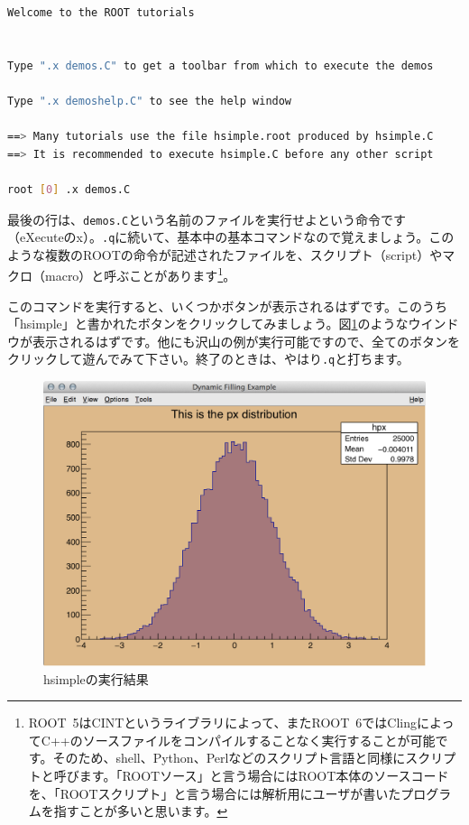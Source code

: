{\begin{lstlisting}[language=bash]
Welcome to the ROOT tutorials


Type ".x demos.C" to get a toolbar from which to execute the demos

Type ".x demoshelp.C" to see the help window

==> Many tutorials use the file hsimple.root produced by hsimple.C
==> It is recommended to execute hsimple.C before any other script

root [0] .x demos.C
\end{lstlisting}
最後の行は、\texttt{demos.C}という名前のファイルを実行せよという命令です（eXecuteのx）。\texttt{.q}に続いて、基本中の基本コマンドなので覚えましょう。このような複数のROOTの命令が記述されたファイルを、スクリプト（script）やマクロ（macro）と呼ぶことがあります\footnote{ROOT~5はCINTというライブラリによって、またROOT~6ではClingによってC++のソースファイルをコンパイルすることなく実行することが可能です。そのため、shell、Python、Perlなどのスクリプト言語と同様にスクリプトと呼びます。「ROOTソース」と言う場合にはROOT本体のソースコードを、「ROOTスクリプト」と言う場合には解析用にユーザが書いたプログラムを指すことが多いと思います。}。

このコマンドを実行すると、いくつかボタンが表示されるはずです。このうち「hsimple」と書かれたボタンをクリックしてみましょう。図\ref{fig:hsimple}のようなウインドウが表示されるはずです。他にも沢山の例が実行可能ですので、全てのボタンをクリックして遊んでみて下さい。終了のときは、やはり\texttt{.q}と打ちます。

\begin{figure}
  \centering
  \includegraphics[width=12cm]{fig/hsimple.png}
  \caption{hsimpleの実行結果}
  \label{fig:hsimple}
\end{figure}

}
